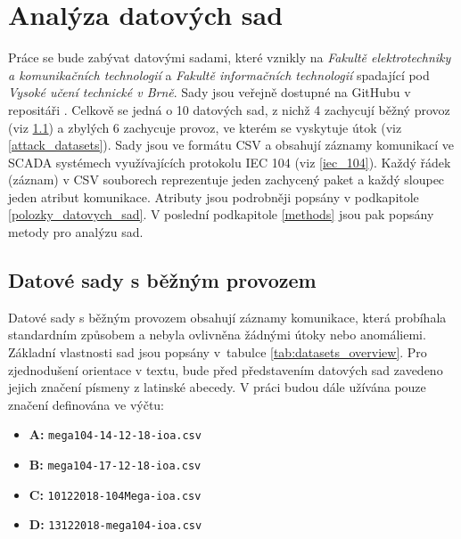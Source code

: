 \chapter{Analýza datových sad}
\label{datasets_analysis}


Práce se bude zabývat datovými sadami, které vznikly na \emph{Fakultě elektrotechniky a komunikačních technologií} a \emph{Fakultě informačních technologií} spadající pod \emph{Vysoké učení technické v Brně}. Sady jsou veřejně dostupné na GitHubu v repositáři \cite{matousek_git}. Celkově se jedná o 10 datových sad, z nichž 4 zachycují běžný provoz (viz \ref{basic_datasets}) a zbylých 6 zachycuje provoz, ve kterém se vyskytuje útok (viz \ref{attack_datasets}). Sady jsou ve formátu CSV a obsahují záznamy komunikací ve SCADA systémech využívajících protokolu IEC 104 (viz \ref{iec_104}). Každý řádek (záznam) v CSV souborech reprezentuje jeden zachycený paket a každý sloupec jeden atribut komunikace. Atributy jsou podrobněji popsány v podkapitole \ref{polozky_datovych_sad}.  V poslední podkapitole \ref{methods} jsou pak popsány metody pro analýzu sad.

\section{Datové sady s běžným provozem}
\label{basic_datasets}

Datové sady s běžným provozem obsahují záznamy komunikace, která probíhala standardním způsobem a nebyla ovlivněna žádnými útoky nebo anomáliemi. Základní vlastnosti sad jsou popsány v~tabulce \ref{tab:datasets_overview}. Pro zjednodušení orientace v textu, bude před představením datových sad zavedeno jejich značení písmeny z latinské abecedy. V práci budou dále užívána pouze značení definována ve výčtu:
\begin{itemize}
    \item \textbf{A:} \texttt{mega104-14-12-18-ioa.csv}
    \item \textbf{B:} \texttt{mega104-17-12-18-ioa.csv}
    \item \textbf{C:} \texttt{10122018-104Mega-ioa.csv}
    \item \textbf{D:} \texttt{13122018-mega104-ioa.csv}
\end{itemize}


